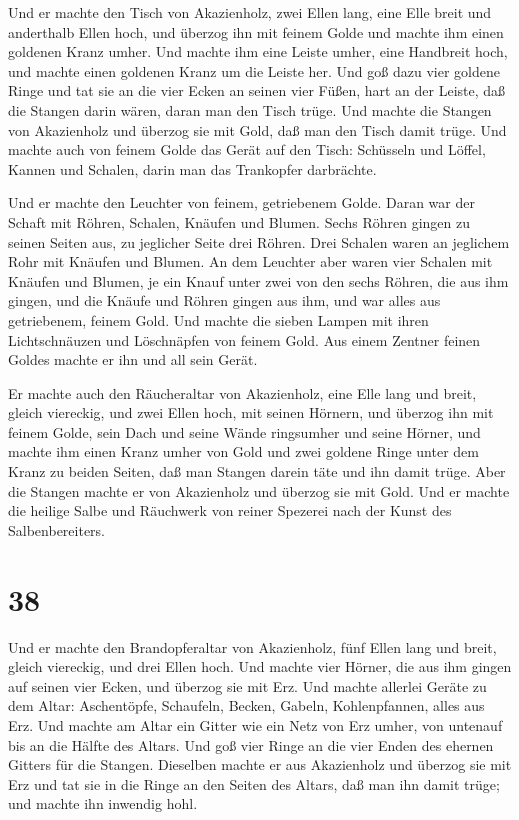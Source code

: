  Und er machte den Tisch von Akazienholz, zwei Ellen lang,
eine Elle breit und anderthalb Ellen hoch,  und überzog ihn
mit feinem Golde und machte ihm einen goldenen Kranz umher.
 Und machte ihm eine Leiste umher, eine Handbreit hoch, und
machte einen goldenen Kranz um die Leiste her.  Und goß
dazu vier goldene Ringe und tat sie an die vier Ecken an seinen vier
Füßen,  hart an der Leiste, daß die Stangen darin wären,
daran man den Tisch trüge.  Und machte die Stangen von
Akazienholz und überzog sie mit Gold, daß man den Tisch damit trüge.
 Und machte auch von feinem Golde das Gerät auf den Tisch:
Schüsseln und Löffel, Kannen und Schalen, darin man das Trankopfer
darbrächte.

 Und er machte den Leuchter von feinem, getriebenem Golde.
Daran war der Schaft mit Röhren, Schalen, Knäufen und Blumen.
 Sechs Röhren gingen zu seinen Seiten aus, zu jeglicher
Seite drei Röhren.  Drei Schalen waren an jeglichem Rohr
mit Knäufen und Blumen.  An dem Leuchter aber waren vier
Schalen mit Knäufen und Blumen,  je ein Knauf unter zwei
von den sechs Röhren, die aus ihm gingen,  und die Knäufe
und Röhren gingen aus ihm, und war alles aus getriebenem, feinem Gold.
 Und machte die sieben Lampen mit ihren Lichtschnäuzen und
Löschnäpfen von feinem Gold.  Aus einem Zentner feinen
Goldes machte er ihn und all sein Gerät.

 Er machte auch den Räucheraltar von Akazienholz, eine Elle
lang und breit, gleich viereckig, und zwei Ellen hoch, mit seinen
Hörnern,  und überzog ihn mit feinem Golde, sein Dach und
seine Wände ringsumher und seine Hörner, und machte ihm einen Kranz
umher von Gold  und zwei goldene Ringe unter dem Kranz zu
beiden Seiten, daß man Stangen darein täte und ihn damit trüge.
 Aber die Stangen machte er von Akazienholz und überzog sie
mit Gold.  Und er machte die heilige Salbe und Räuchwerk
von reiner Spezerei nach der Kunst des Salbenbereiters.

\hypertarget{section-37}{%
\section{38}\label{section-37}}

 Und er machte den Brandopferaltar von Akazienholz, fünf
Ellen lang und breit, gleich viereckig, und drei Ellen hoch.
 Und machte vier Hörner, die aus ihm gingen auf seinen vier
Ecken, und überzog sie mit Erz.  Und machte allerlei Geräte
zu dem Altar: Aschentöpfe, Schaufeln, Becken, Gabeln, Kohlenpfannen,
alles aus Erz.  Und machte am Altar ein Gitter wie ein Netz
von Erz umher, von untenauf bis an die Hälfte des Altars. 
Und goß vier Ringe an die vier Enden des ehernen Gitters für die
Stangen.  Dieselben machte er aus Akazienholz und überzog
sie mit Erz  und tat sie in die Ringe an den Seiten des
Altars, daß man ihn damit trüge; und machte ihn inwendig hohl.

